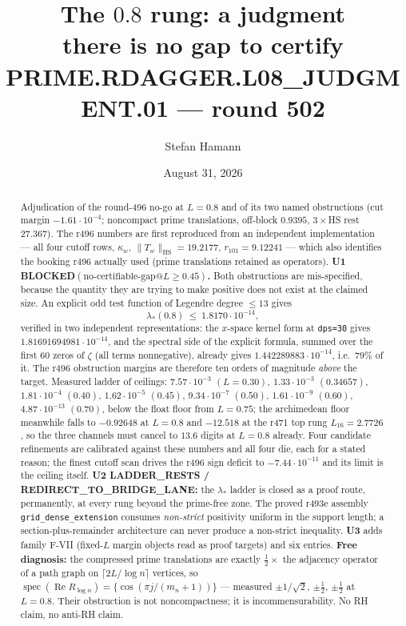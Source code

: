 \documentclass[11pt]{article}
\title{\bfseries The $0.8$ rung: a judgment\\[2mm]
\large there is no gap to certify\\[2mm]
\large PRIME.RDAGGER.L08\_JUDGMENT.01 --- round 502}
\author{Stefan Hamann}
\date{August 31, 2026}
\theoremstyle{remark}
\newcommand{\blocked}{\textcolor{red!65!black}{BLOCKED}}
\begin{document}
\maketitle

\begin{abstract}\noindent
Adjudication of the round-496 no-go at $L=0.8$ and of its two named
obstructions (cut margin $-1.61\cdot10^{-4}$; noncompact prime
translations, off-block $0.9395$, $3\times$HS rest $27.367$).
The r496 numbers are first reproduced from an independent
implementation --- all four cutoff rows, $\kappa_w$,
$\|T_w\|_{\mathrm{HS}}=19.2177$, $r_{101}=9.12241$ --- which also
identifies the booking r496 actually used (prime translations retained
as operators).
\textbf{U1 \blocked{}$(\text{no-certifiable-gap}@L\ge0.45)$.}
Both obstructions are mis-specified, because the quantity they are
trying to make positive does not exist at the claimed size.  An
explicit odd test function of Legendre degree $\le13$ gives
\[
  \lambda_*(0.8)\ \le\ 1.8170\cdot10^{-14},
\]
verified in two independent representations: the $x$-space kernel form
at \texttt{dps=30} gives $1.81691694981\cdot10^{-14}$, and the
spectral side of the explicit formula, summed over the first $60$
zeros of $\zeta$ (all terms nonnegative), already gives
$1.442289883\cdot10^{-14}$, i.e.\ $79\%$ of it.
The r496 obstruction margins are therefore ten orders of magnitude
\emph{above} the target.  Measured ladder of ceilings:
$7.57\cdot10^{-3}$ $(L=0.30)$, $1.33\cdot10^{-3}$ $(0.34657)$,
$1.81\cdot10^{-4}$ $(0.40)$, $1.62\cdot10^{-5}$ $(0.45)$,
$9.34\cdot10^{-7}$ $(0.50)$, $1.61\cdot10^{-9}$ $(0.60)$,
$4.87\cdot10^{-13}$ $(0.70)$, below the float floor from $L=0.75$;
the archimedean floor meanwhile falls to $-0.92648$ at $L=0.8$ and
$-12.518$ at the r471 top rung $L_{16}=2.7726$, so the three channels
must cancel to $13.6$ digits at $L=0.8$ already.
Four candidate refinements are calibrated against these numbers and
all four die, each for a stated reason; the finest cutoff scan drives
the r496 sign deficit to $-7.44\cdot10^{-11}$ and its limit is the
ceiling itself.
\textbf{U2 LADDER\_RESTS / REDIRECT\_TO\_BRIDGE\_LANE:} the
$\lambda_*$ ladder is closed as a proof route, permanently, at every
rung beyond the prime-free zone.  The proved r493e assembly
\texttt{grid\_dense\_extension} consumes \emph{non-strict} positivity
uniform in the support length; a section-plus-remainder architecture
can never produce a non-strict inequality.
\textbf{U3} adds family F-VII (fixed-$L$ margin objects read as proof
targets) and six entries.
\textbf{Free diagnosis:} the compressed prime translations are exactly
$\tfrac12\times$ the adjacency operator of a path graph on
$\lceil2L/\log n\rceil$ vertices, so $\operatorname{spec}
(\operatorname{Re}R_{\log n})=\{\cos(\pi j/(m_n+1))\}$ --- measured
$\pm1/\sqrt2$, $\pm\tfrac12$, $\pm\tfrac12$ at $L=0.8$.  Their
obstruction is not noncompactness; it is incommensurability.
No RH claim, no anti-RH claim.
\end{abstract}
\end{document}
